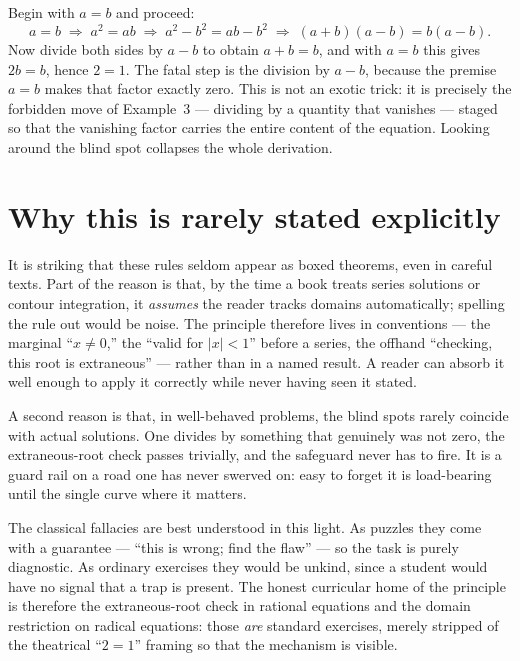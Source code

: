 \documentclass{essay}
\begin{document}
\begin{example}[The ``$2 = 1$'' fallacy]
  Begin with $a = b$ and proceed:
  \[
    a = b
    \;\Rightarrow\; a^2 = ab
    \;\Rightarrow\; a^2 - b^2 = ab - b^2
    \;\Rightarrow\; (a+b)(a-b) = b(a-b).
  \]
  Now divide both sides by $a - b$ to obtain $a + b = b$, and with $a = b$ this gives
  $2b = b$, hence $2 = 1$. The fatal step is the division by $a - b$, because the premise
  $a = b$ makes that factor exactly zero. This is not an exotic trick: it is precisely the
  forbidden move of Example~3 --- dividing by a quantity that vanishes --- staged so that the
  vanishing factor carries the entire content of the equation. Looking around the blind spot
  collapses the whole derivation.
\end{example}

\section{Why this is rarely stated explicitly}

It is striking that these rules seldom appear as boxed theorems, even in careful texts. Part
of the reason is that, by the time a book treats series solutions or contour integration, it
\emph{assumes} the reader tracks domains automatically; spelling the rule out would be noise.
The principle therefore lives in conventions --- the marginal ``$x \neq 0$,'' the ``valid for
$|x| < 1$'' before a series, the offhand ``checking, this root is extraneous'' --- rather
than in a named result. A reader can absorb it well enough to apply it correctly while never
having seen it stated.

A second reason is that, in well-behaved problems, the blind spots rarely coincide with
actual solutions. One divides by something that genuinely was not zero, the
extraneous-root check passes trivially, and the safeguard never has to fire. It is a guard
rail on a road one has never swerved on: easy to forget it is load-bearing until the single
curve where it matters.

The classical fallacies are best understood in this light. As puzzles they come with a
guarantee --- ``this is wrong; find the flaw'' --- so the task is purely diagnostic. As
ordinary exercises they would be unkind, since a student would have no signal that a trap is
present. The honest curricular home of the principle is therefore the extraneous-root check
in rational equations and the domain restriction on radical equations: those \emph{are}
standard exercises, merely stripped of the theatrical ``$2 = 1$'' framing so that the
mechanism is visible.
\end{document}
